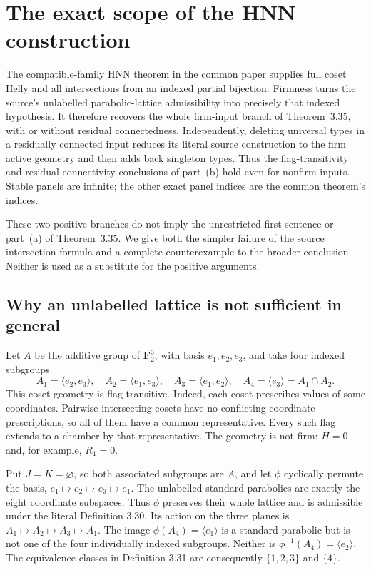 \section{The exact scope of the HNN construction}\label{sec:app-hnn}
The compatible-family HNN theorem in the common paper supplies full coset Helly and all intersections from an indexed partial bijection. Firmness turns the source's unlabelled parabolic-lattice admissibility into precisely that indexed hypothesis. It therefore recovers the whole firm-input branch of Theorem~3.35, with or without residual connectedness. Independently, deleting universal types in a residually connected input reduces its literal source construction to the firm active geometry and then adds back singleton types. Thus the flag-transitivity and residual-connectivity conclusions of part~(b) hold even for nonfirm inputs. Stable panels are infinite; the other exact panel indices are the common theorem's indices.

These two positive branches do not imply the unrestricted first sentence or part~(a) of Theorem~3.35. We give both the simpler failure of the source intersection formula and a complete counterexample to the broader conclusion. Neither is used as a substitute for the positive arguments.

\subsection*{Why an unlabelled lattice is not sufficient in general}
Let $A$ be the additive group of $\mathbf F_2^3$, with basis
$e_1,e_2,e_3$, and take four indexed subgroups
\[
 A_1=\langle e_2,e_3\rangle,\quad
 A_2=\langle e_1,e_3\rangle,\quad
 A_3=\langle e_1,e_2\rangle,\quad
 A_4=\langle e_3\rangle=A_1\cap A_2.
\]
This coset geometry is flag-transitive. Indeed, each coset prescribes
values of some coordinates. Pairwise intersecting cosets have no
conflicting coordinate prescriptions, so all of them have a common
representative. Every such flag extends to a chamber by that representative.
The geometry is not firm: $H=0$ and, for example, $R_1=0$.

Put $J=K=\varnothing$, so both associated subgroups are $A$, and let
$\phi$ cyclically permute the basis,
$e_1\mapsto e_2\mapsto e_3\mapsto e_1$.
The unlabelled standard parabolics are exactly the eight coordinate
subspaces. Thus $\phi$ preserves their whole lattice and is admissible
under the literal Definition 3.30. Its action on the three planes is
$A_1\mapsto A_2\mapsto A_3\mapsto A_1$. The image
$\phi(A_4)=\langle e_1\rangle$ is a standard parabolic but is not one
of the four individually indexed subgroups. Neither is
$\phi^{-1}(A_4)=\langle e_2\rangle$.
The equivalence classes in Definition 3.31 are consequently
$\{1,2,3\}$ and $\{4\}$.

